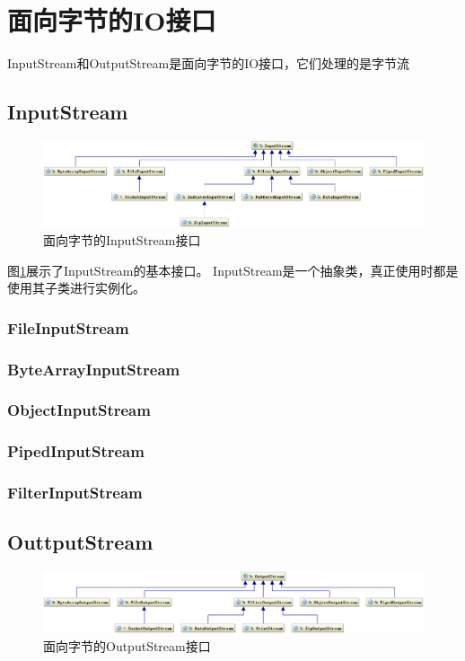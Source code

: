 ﻿\section[面向字节的IO接口]{面向字节的IO接口}
InputStream和OutputStream是面向字节的IO接口，它们处理的是字节流

\subsection[InputStream]{InputStream}
\begin{figure}
  \centering
  \includegraphics[width=.9\textwidth]{picturedir/inputstream.png}
  \caption{面向字节的InputStream接口}
  \label{fig:inputstream}
\end{figure}

图\ref{fig:inputstream}展示了InputStream的基本接口。
InputStream是一个抽象类，真正使用时都是使用其子类进行实例化。

\subsubsection[FileInputStream]{FileInputStream}
\subsubsection[ByteArrayInputStream]{ByteArrayInputStream}
\subsubsection[ObjectInputStream]{ObjectInputStream}
\subsubsection[PipedInputStream]{PipedInputStream}
\subsubsection[FilterInputStream]{FilterInputStream}

\subsection[OutputStream]{OuttputStream}
\begin{figure}
  \centering
  \includegraphics[width=.9\textwidth]{picturedir/outputstream.png}
  \caption{面向字节的OutputStream接口}
  \label{fig:outputstream}
\end{figure}

